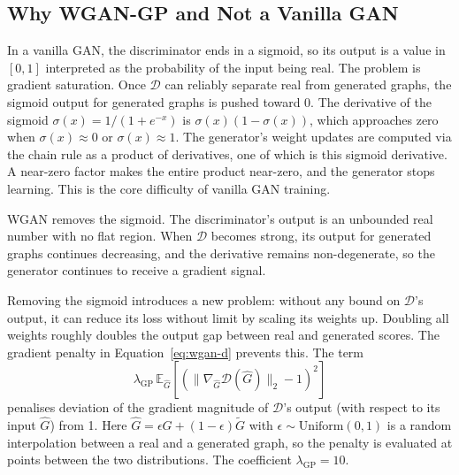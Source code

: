 \documentclass[12pt,a4paper]{article}
\begin{document}
\subsection{Why WGAN-GP and Not a Vanilla GAN}

In a vanilla GAN, the discriminator ends in a sigmoid, so its output is a value in $[0, 1]$ interpreted as the probability of the input being real. The problem is gradient saturation. Once $\mathcal{D}$ can reliably separate real from generated graphs, the sigmoid output for generated graphs is pushed toward 0. The derivative of the sigmoid $\sigma(x) = 1/(1+e^{-x})$ is $\sigma(x)(1 - \sigma(x))$, which approaches zero when $\sigma(x) \approx 0$ or $\sigma(x) \approx 1$. The generator's weight updates are computed via the chain rule as a product of derivatives, one of which is this sigmoid derivative. A near-zero factor makes the entire product near-zero, and the generator stops learning. This is the core difficulty of vanilla GAN training.

WGAN removes the sigmoid. The discriminator's output is an unbounded real number with no flat region. When $\mathcal{D}$ becomes strong, its output for generated graphs continues decreasing, and the derivative remains non-degenerate, so the generator continues to receive a gradient signal.

Removing the sigmoid introduces a new problem: without any bound on $\mathcal{D}$'s output, it can reduce its loss without limit by scaling its weights up. Doubling all weights roughly doubles the output gap between real and generated scores. The gradient penalty in Equation~\eqref{eq:wgan-d} prevents this. The term
\[
  \lambda_{\text{GP}} \, \mathbb{E}_{\hat{G}}\!\left[(\|\nabla_{\hat{G}} \mathcal{D}(\hat{G})\|_2 - 1)^2\right]
\]
penalises deviation of the gradient magnitude of $\mathcal{D}$'s output (with respect to its input $\hat{G}$) from 1. Here $\hat{G} = \epsilon G + (1-\epsilon)\tilde{G}$ with $\epsilon \sim \text{Uniform}(0,1)$ is a random interpolation between a real and a generated graph, so the penalty is evaluated at points between the two distributions. The coefficient $\lambda_{\text{GP}} = 10$.
\end{document}

